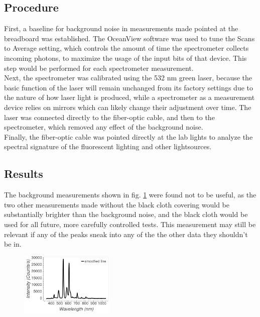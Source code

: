 \documentclass[aps,prl,reprint]{revtex4-2}
\begin{document}
\subsection{Procedure}

First, a baseline for background noise in measurements made pointed at the breadboard
was established. The OceanView software was used to tune the Scans to Average setting,
which controls the amount of time the spectrometer collects incoming photons,
to maximize the usage of the input bits of that device. This step would be performed
for each spectrometer measurement. \\

Next, the spectrometer was calibrated using the 532 nm green laser, because the
basic function of the laser will remain unchanged from its factory settings due to
the nature of how laser light is produced, while a spectrometer as a measurement
device relies on mirrors which can likely change their adjustment over time. The laser
was connected directly to the fiber-optic cable, and then to the spectrometer, which
removed any effect of the background noise.\\

Finally, the fiber-optic cable was pointed directly at the lab lights to analyze the 
spectral signature of the fluorescent lighting and other lightsources.\\

\subsection{Results}


The background measurements shown in fig. \ref{bkg} were found not to be useful, as 
the two other measurements made without the black cloth covering would be 
substantially brighter than the background noise, and the black cloth would be used 
for all future, more carefully controlled tests. This measurement may still be
relevant if any of the peaks sneak into any of the the other data they shouldn't be 
in.\\

\begin{figure}[h]
\includegraphics[width=0.4\textwidth]{../Images/l3_A_bkg.png}
\caption{\label{bkg}}
\end{figure}
\end{document}
